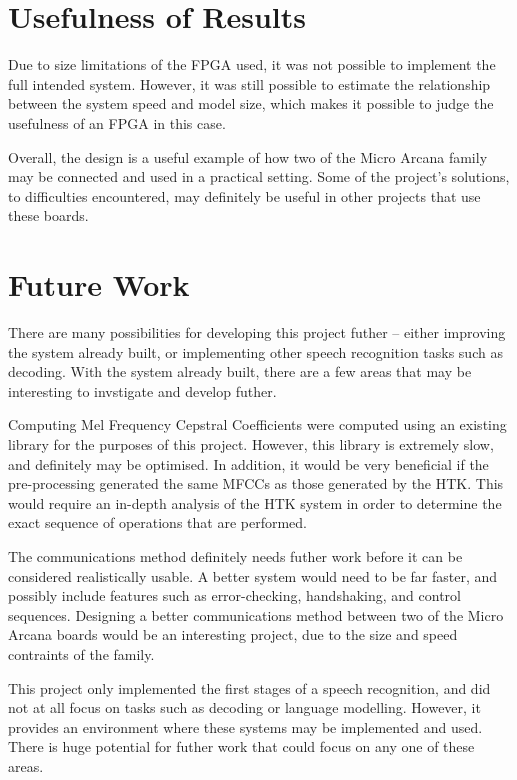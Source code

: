\section{Usefulness of Results} %
\label{sec:usefulness}
	Due to size limitations of the FPGA used, it was not possible to implement the full intended system.  However, it was still possible to estimate the relationship between the system speed and model size, which makes it possible to judge the usefulness of an FPGA in this case.  

	Overall, the design is a useful example of how two of the Micro Arcana family may be connected and used in a practical setting.  Some of the project's solutions, to difficulties encountered, may definitely be useful in other projects that use these boards.  


\section{Future Work} %
\label{sec:future_work}
	There are many possibilities for developing this project futher -- either improving the system already built, or implementing other speech recognition tasks such as decoding.  With the system already built, there are a few areas that may be interesting to invstigate and develop futher.

	Computing Mel Frequency Cepstral Coefficients were computed using an existing library for the purposes of this project.  However, this library is extremely slow, and definitely may be optimised.  In addition, it would be very beneficial if the pre-processing generated the same MFCCs as those generated by the HTK.  This would require an in-depth analysis of the HTK system in order to determine the exact sequence of operations that are performed.

	The communications method definitely needs futher work before it can be considered realistically usable.  A better system would need to be far faster, and possibly include features such as error-checking, handshaking, and control sequences.  Designing a better communications method between two of the Micro Arcana boards would be an interesting project, due to the size and speed contraints of the family.

	This project only implemented the first stages of a speech recognition, and did not at all focus on tasks such as decoding or language modelling.  However, it provides an environment where these systems may be implemented and used.  There is huge potential for futher work that could focus on any one of these areas.


